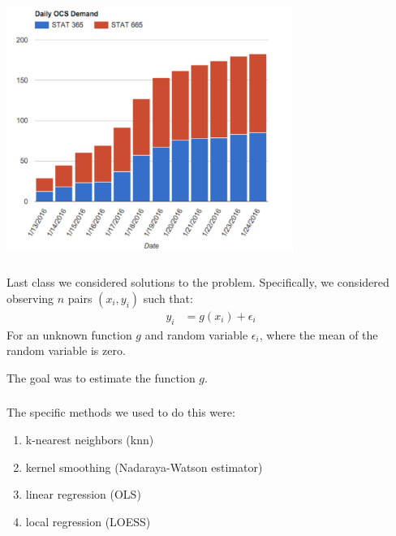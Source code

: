 \documentclass[xetex,mathserif,serif,aspectratio=169]{beamer}
\begin{document}
\begin{frame}[fragile] \frametitle{} \oldB \small

\begin{center}
\includegraphics[width=0.7\textwidth]{img/stat665.pdf}
\end{center}

\end{frame}

\begin{frame}[fragile] \frametitle{} \oldB \small

Last class we considered solutions to the
 problem.
Specifically, we considered observing $n$ pairs $(x_i,y_i)$ such
that:
\begin{align*}
y_i &= g(x_i) + \epsilon_i
\end{align*}
For an unknown function $g$ and random variable $\epsilon_i$, where the mean
of the random variable is zero.

The goal was to estimate the function $g$.

\end{frame}

\begin{frame}[fragile] \frametitle{} \oldB \small

The specific methods we used to do this were:

\begin{enumerate}
\item k-nearest neighbors (knn)
\item kernel smoothing (Nadaraya-Watson estimator)
\item linear regression (OLS)
\item local regression (LOESS)
\end{enumerate}

\end{frame}
\end{document}
